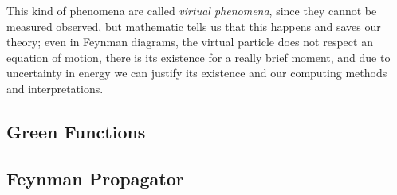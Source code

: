 This kind of phenomena are called \textit{virtual phenomena}, since they cannot be measured observed, but mathematic tells us that this happens and saves our theory; even in Feynman diagrams, the virtual particle does not respect an equation of motion, there is its existence for a really brief moment, and due to uncertainty in energy we can justify its existence and our computing methods and interpretations.

\subsection{Green Functions}

\subsection{Feynman Propagator}